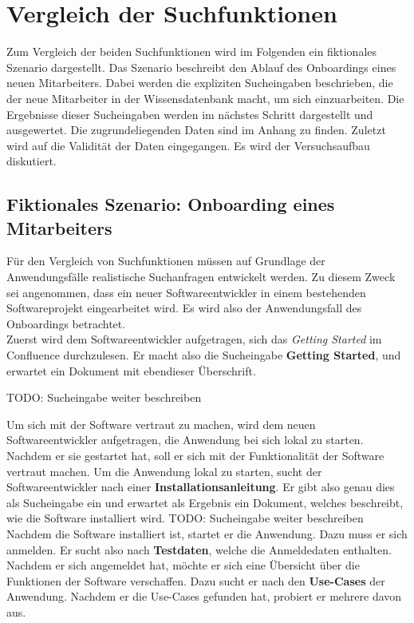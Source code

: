 \chapter{Vergleich der Suchfunktionen}
\label{chap:vergleich-der-suchfunktionen}

Zum Vergleich der beiden Suchfunktionen wird im Folgenden ein fiktionales Szenario dargestellt.
Das Szenario beschreibt den Ablauf des Onboardings eines neuen Mitarbeiters.
Dabei werden die expliziten Sucheingaben beschrieben, die der neue Mitarbeiter in der Wissensdatenbank macht, um sich einzuarbeiten.
Die Ergebnisse dieser Sucheingaben werden im nächstes Schritt dargestellt und ausgewertet.
Die zugrundeliegenden Daten sind im Anhang zu finden.
Zuletzt wird auf die Validität der Daten eingegangen.
Es wird der Versuchsaufbau diskutiert.

\section{Fiktionales Szenario: Onboarding eines Mitarbeiters}

Für den Vergleich von Suchfunktionen müssen auf Grundlage der Anwendungsfälle realistische Suchanfragen entwickelt werden.
Zu diesem Zweck sei angenommen, dass ein neuer Softwareentwickler in einem bestehenden Softwareprojekt eingearbeitet wird.
Es wird also der Anwendungsfall des Onboardings betrachtet.\\

Zuerst wird dem Softwareentwickler aufgetragen, sich das \textit{Getting Started} im Confluence durchzulesen.
Er macht also die Sucheingabe \textbf{Getting Started}, und erwartet ein Dokument mit ebendieser Überschrift.

TODO: Sucheingabe weiter beschreiben

Um sich mit der Software vertraut zu machen, wird dem neuen Softwareentwickler aufgetragen, die Anwendung bei sich lokal zu starten.
Nachdem er sie gestartet hat, soll er sich mit der Funktionalität der Software vertraut machen.
Um die Anwendung lokal zu starten, sucht der Softwareentwickler nach einer \textbf{Installationsanleitung}.
Er gibt also genau dies als Sucheingabe ein und erwartet als Ergebnis ein Dokument, welches beschreibt, wie die Software installiert wird.
TODO: Sucheingabe weiter beschreiben\\

Nachdem die Software installiert ist, startet er die Anwendung.
Dazu muss er sich anmelden.
Er sucht also nach \textbf{Testdaten}, welche die Anmeldedaten enthalten.
Nachdem er sich angemeldet hat, möchte er sich eine Übersicht über die Funktionen der Software verschaffen.
Dazu sucht er nach den \textbf{Use-Cases} der Anwendung.
Nachdem er die Use-Cases gefunden hat, probiert er mehrere davon aus.\\

